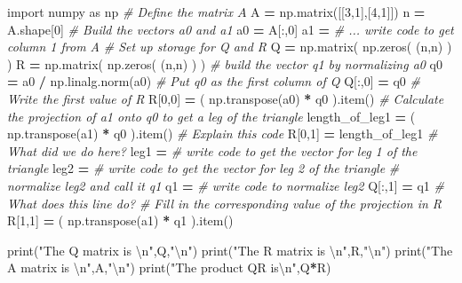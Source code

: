 \documentclass[
]{book}
\newenvironment{Shaded}{\begin{snugshade}}{\end{snugshade}}
\newcommand{\BuiltInTok}[1]{#1}
\newcommand{\CharTok}[1]{\textcolor[rgb]{0.31,0.60,0.02}{#1}}
\newcommand{\CommentTok}[1]{\textcolor[rgb]{0.56,0.35,0.01}{\textit{#1}}}
\newcommand{\DecValTok}[1]{\textcolor[rgb]{0.00,0.00,0.81}{#1}}
\newcommand{\ImportTok}[1]{#1}
\newcommand{\NormalTok}[1]{#1}
\newcommand{\OperatorTok}[1]{\textcolor[rgb]{0.81,0.36,0.00}{\textbf{#1}}}
\newcommand{\StringTok}[1]{\textcolor[rgb]{0.31,0.60,0.02}{#1}}
\theoremstyle{definition}
\theoremstyle{definition}
\theoremstyle{definition}
\theoremstyle{remark}
\begin{document}
\begin{Shaded}
\begin{Highlighting}[]
\ImportTok{import}\NormalTok{ numpy }\ImportTok{as}\NormalTok{ np}
\CommentTok{\# Define the matrix $A$}
\NormalTok{A }\OperatorTok{=}\NormalTok{ np.matrix([[}\DecValTok{3}\NormalTok{,}\DecValTok{1}\NormalTok{],[}\DecValTok{4}\NormalTok{,}\DecValTok{1}\NormalTok{]])}
\NormalTok{n }\OperatorTok{=}\NormalTok{ A.shape[}\DecValTok{0}\NormalTok{]}
\CommentTok{\# Build the vectors a0 and a1}
\NormalTok{a0 }\OperatorTok{=}\NormalTok{ A[:,}\DecValTok{0}\NormalTok{]}
\NormalTok{a1 }\OperatorTok{=} \CommentTok{\# ... write code to get column 1 from A}
\CommentTok{\# Set up storage for Q and R}
\NormalTok{Q }\OperatorTok{=}\NormalTok{ np.matrix( np.zeros( (n,n) ) )}
\NormalTok{R }\OperatorTok{=}\NormalTok{ np.matrix( np.zeros( (n,n) ) )}
\CommentTok{\# build the vector q1 by normalizing a0}
\NormalTok{q0 }\OperatorTok{=}\NormalTok{ a0 }\OperatorTok{/}\NormalTok{ np.linalg.norm(a0)}
\CommentTok{\# Put q0 as the first column of Q}
\NormalTok{Q[:,}\DecValTok{0}\NormalTok{] }\OperatorTok{=}\NormalTok{ q0}
\CommentTok{\# Write the first value of R}
\NormalTok{R[}\DecValTok{0}\NormalTok{,}\DecValTok{0}\NormalTok{] }\OperatorTok{=}\NormalTok{ ( np.transpose(a0) }\OperatorTok{*}\NormalTok{ q0 ).item()}
\CommentTok{\# Calculate the projection of a1 onto q0 to get a leg of the triangle}
\NormalTok{length\_of\_leg1 }\OperatorTok{=}\NormalTok{ ( np.transpose(a1) }\OperatorTok{*}\NormalTok{ q0 ).item() }\CommentTok{\# Explain this code}
\NormalTok{R[}\DecValTok{0}\NormalTok{,}\DecValTok{1}\NormalTok{] }\OperatorTok{=}\NormalTok{ length\_of\_leg1 }\CommentTok{\# What did we do here?}
\NormalTok{leg1 }\OperatorTok{=} \CommentTok{\# write code to get the vector for leg 1 of the triangle}
\NormalTok{leg2 }\OperatorTok{=} \CommentTok{\# write code to get the vector for leg 2 of the triangle}
\CommentTok{\# normalize leg2 and call it q1}
\NormalTok{q1 }\OperatorTok{=} \CommentTok{\# write code to normalize leg2}
\NormalTok{Q[:,}\DecValTok{1}\NormalTok{] }\OperatorTok{=}\NormalTok{ q1 }\CommentTok{\# What does this line do?}
\CommentTok{\# Fill in the corresponding value of the projection in R}
\NormalTok{R[}\DecValTok{1}\NormalTok{,}\DecValTok{1}\NormalTok{] }\OperatorTok{=}\NormalTok{ ( np.transpose(a1) }\OperatorTok{*}\NormalTok{ q1 ).item()}

\BuiltInTok{print}\NormalTok{(}\StringTok{"The Q matrix is }\CharTok{\textbackslash{}n}\StringTok{"}\NormalTok{,Q,}\StringTok{"}\CharTok{\textbackslash{}n}\StringTok{"}\NormalTok{)}
\BuiltInTok{print}\NormalTok{(}\StringTok{"The R matrix is }\CharTok{\textbackslash{}n}\StringTok{"}\NormalTok{,R,}\StringTok{"}\CharTok{\textbackslash{}n}\StringTok{"}\NormalTok{)}
\BuiltInTok{print}\NormalTok{(}\StringTok{"The A matrix is }\CharTok{\textbackslash{}n}\StringTok{"}\NormalTok{,A,}\StringTok{"}\CharTok{\textbackslash{}n}\StringTok{"}\NormalTok{)}
\BuiltInTok{print}\NormalTok{(}\StringTok{"The product QR is}\CharTok{\textbackslash{}n}\StringTok{"}\NormalTok{,Q}\OperatorTok{*}\NormalTok{R)}
\end{Highlighting}
\end{Shaded}
\end{document}

